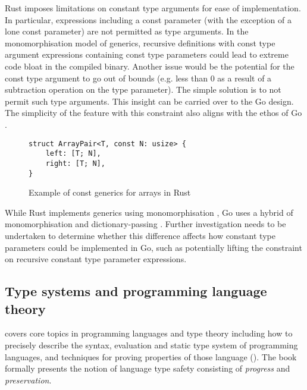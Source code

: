 Rust imposes limitations on constant type arguments for ease of implementation.
In particular, expressions including a const parameter (with the exception of a
lone const parameter) are not permitted as type arguments. In the
monomorphisation model of generics, recursive definitions with const type
argument expressions containing const type parameters could lead to extreme code
bloat in the compiled binary. Another issue would be the potential for the const
type argument to go out of bounds (e.g. less than 0 as a result of a subtraction
operation on the type parameter). The simple solution is to not permit such type
arguments. This insight can be carried over to the Go design. The simplicity of
the feature with this constraint also aligns with the ethos of Go
\autocite{goSimplicity}.


\begin{figure}
    \begin{lstlisting}
struct ArrayPair<T, const N: usize> {
    left: [T; N],
    right: [T; N],
}
\end{lstlisting}
    \caption{Example of const generics for arrays in Rust \autocite{rustConstBlog}}
\end{figure}


While Rust implements generics using monomorphisation
\autocite{rustCompilerGuide}, Go uses a hybrid of monomorphisation and
dictionary-passing \autocite{generics1.18}. Further investigation needs to be
undertaken to determine whether this difference affects how constant type
parameters could be implemented in Go, such as potentially lifting the
constraint on recursive constant type parameter expressions.

\subsection{Type systems and programming language theory}

\citeauthor{tapl} covers core topics in programming languages and type theory
including how to precisely describe the syntax, evaluation and static type
system of programming languages, and techniques for proving properties of those
language (\citeyear{tapl}). The book formally presents the notion of language
type safety consisting of \emph{progress} and \emph{preservation}.

